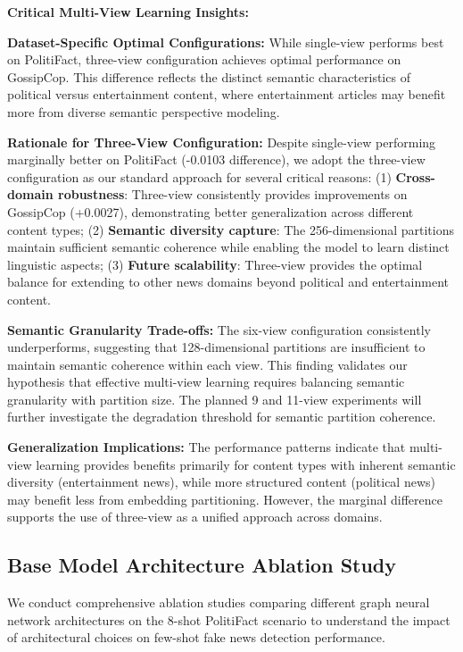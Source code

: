\textbf{Critical Multi-View Learning Insights:}

\textbf{Dataset-Specific Optimal Configurations:} While single-view performs best on PolitiFact, three-view configuration achieves optimal performance on GossipCop. This difference reflects the distinct semantic characteristics of political versus entertainment content, where entertainment articles may benefit more from diverse semantic perspective modeling.

\textbf{Rationale for Three-View Configuration:} Despite single-view performing marginally better on PolitiFact (-0.0103 difference), we adopt the three-view configuration as our standard approach for several critical reasons: (1) \textbf{Cross-domain robustness}: Three-view consistently provides improvements on GossipCop (+0.0027), demonstrating better generalization across different content types; (2) \textbf{Semantic diversity capture}: The 256-dimensional partitions maintain sufficient semantic coherence while enabling the model to learn distinct linguistic aspects; (3) \textbf{Future scalability}: Three-view provides the optimal balance for extending to other news domains beyond political and entertainment content.

\textbf{Semantic Granularity Trade-offs:} The six-view configuration consistently underperforms, suggesting that 128-dimensional partitions are insufficient to maintain semantic coherence within each view. This finding validates our hypothesis that effective multi-view learning requires balancing semantic granularity with partition size. The planned 9 and 11-view experiments will further investigate the degradation threshold for semantic partition coherence.

\textbf{Generalization Implications:} The performance patterns indicate that multi-view learning provides benefits primarily for content types with inherent semantic diversity (entertainment news), while more structured content (political news) may benefit less from embedding partitioning. However, the marginal difference supports the use of three-view as a unified approach across domains.

\subsection{Base Model Architecture Ablation Study}

We conduct comprehensive ablation studies comparing different graph neural network architectures on the 8-shot PolitiFact scenario to understand the impact of architectural choices on few-shot fake news detection performance.


